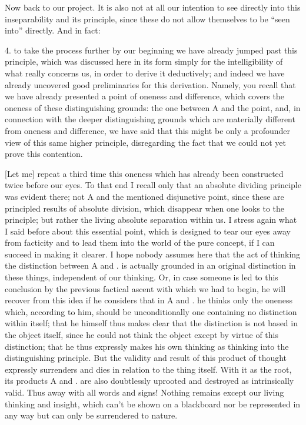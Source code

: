 Now back to our project.
It is also not at all our intention to see directly
into this inseparability and its principle,
since these do not allow themselves
to be “seen into” directly.
And in fact:

4. to take the process further
by our beginning we have already jumped past this principle,
which was discussed here in its form simply
for the intelligibility of what really concerns us,
in order to derive it deductively;
and indeed we have already uncovered
good preliminaries for this derivation.
Namely, you recall that we have already presented
a point of oneness and difference,
which covers the oneness of these distinguishing grounds:
the one between A and the point,
and, in connection with the deeper distinguishing grounds
which are materially different from oneness and difference,
we have said that this might be only a profounder view
of this same higher principle,
disregarding the fact that we could not
yet prove this contention.

[Let me] repeat a third time this oneness
which has already been constructed twice before our eyes.
To that end I recall only that
an absolute dividing principle was evident there;
not A and the mentioned disjunctive point,
since these are principled results of absolute division,
which disappear when one looks to the principle;
but rather the living absolute separation within us.
I stress again what I said before about this essential point,
which is designed to tear our eyes away from facticity
and to lead them into the world of the pure concept,
if I can succeed in making it clearer.
I hope nobody assumes here that the act of thinking
the distinction between A and . is actually grounded
in an original distinction in these things,
independent of our thinking.
Or, in case someone is led to this conclusion
by the previous factical ascent with which we had to begin,
he will recover from this idea if he considers
that in A and . he thinks only the oneness
which, according to him, should be unconditionally one
containing no distinction within itself;
that he himself thus makes clear that
the distinction is not based in the object itself,
since he could not think the object except
by virtue of this distinction;
that he thus expressly makes his own thinking as thinking
into the distinguishing principle.
But the validity and result of this product of thought
expressly surrenders and dies
in relation to the thing itself.
With it as the root, its products A and . are also
doubtlessly uprooted and destroyed as intrinsically valid.
Thus away with all words and signs!
Nothing remains except our living thinking and insight,
which can’t be shown on a blackboard
nor be represented in any way
but can only be surrendered to nature.

